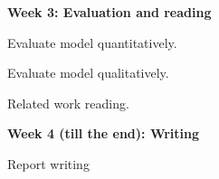 \noindent
\textbf{Week 3: Evaluation and reading}
\begin{compactitem}
\item Evaluate model quantitatively.
\item Evaluate model qualitatively.
\item Related work reading.
\end{compactitem}

\noindent
\textbf{Week 4 (till the end): Writing}
\begin{compactitem}
\item Report writing
\end{compactitem}



